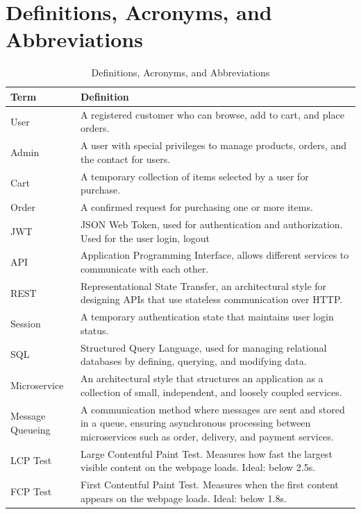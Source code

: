 \documentclass[oneside,a4paper,12pt,explicit]{book}
\renewcommand{\arraystretch}{1.2} %
\begin{document}
\section{Definitions, Acronyms, and Abbreviations}
\begin{table}[H]
    \centering
    \renewcommand{\arraystretch}{1.2} %
    \begin{tabularx}{\textwidth}{|l|X|}
        \hline
        \textbf{Term} & \textbf{Definition} \\
        \hline
        User & A registered customer who can browse, add to cart, and place orders. \\
        \hline
        Admin & A user with special privileges to manage products, orders, and the contact for users. \\
        \hline
        Cart & A temporary collection of items selected by a user for purchase. \\
        \hline
        Order & A confirmed request for purchasing one or more items. \\
        \hline
        JWT & JSON Web Token, used for authentication and authorization. Used for the user login, logout\cite{rfc7519}  \\
        \hline
        API & Application Programming Interface, allows different services to communicate with each other.\cite{API}\\
        \hline
        REST & Representational State Transfer, an architectural style for designing APIs that use stateless communication over HTTP.\cite{REST} \\
        \hline
        Session & A temporary authentication state that maintains user login status. \\
        \hline
        SQL & Structured Query Language, used for managing relational databases by defining, querying, and modifying data.\cite{SQL}\\
        \hline
        Microservice & An architectural style that structures an application as a collection of small, independent, and loosely coupled services.\cite{9282637} \\
        \hline
        Message Queueing & A communication method where messages are sent and stored in a queue, ensuring asynchronous processing between microservices such as order, delivery, and payment services.\cite{Bouchenak2009}\\
        \hline
        LCP Test & Large Contentful Paint Test. Measures how fast the largest visible content on the webpage loads. Ideal: below 2.5s. \\
        \hline
        FCP Test & First Contentful Paint Test. Measures when the first content appears on the webpage loads. Ideal: below 1.8s. \\
        \hline
    \end{tabularx}
    \caption{Definitions, Acronyms, and Abbreviations}
    \label{tab:definitions}

\end{table}
\end{document}
